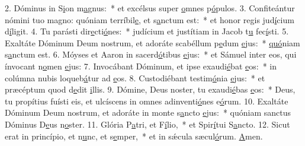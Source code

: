 2. Dóminus in S\uline{i}on m\uline{a}gnus:~* et excélsus super \uline{o}mnes p\uline{ó}pulos.
3. Confiteántur nómini tuo magno: quóniam terríbil\uline{e}, et s\uline{a}nctum est:~* et honor regis jud\uline{í}cium d\uline{í}ligit.
4. Tu parásti dir\uline{e}cti\uline{ó}nes:~* judícium et justítiam in Jacob t\uline{u} fec\uline{í}sti.
5. Exaltáte Dóminum Deum nostrum, et adoráte scabéllum p\uline{e}dum \uline{e}jus:~* \uline{quó}niam s\uline{a}nctum est.
6. Móyses et Aaron in sacerd\uline{ó}tibus \uline{e}jus:~* et Sámuel inter eos, qui ínvocant n\uline{o}men \uline{e}jus:
7. Invocábant Dóminum, et ipse exaudi\uline{é}bat \uline{e}os:~* in colúmna nubis loqueb\uline{á}tur ad \uline{e}os.
8. Custodiébant testim\uline{ó}nia \uline{e}jus:~* et præcéptum quod d\uline{e}dit \uline{i}llis.
9. Dómine, Deus noster, tu exaudi\uline{é}bas \uline{e}os:~* Deus, tu propítius fuísti eis, et ulcíscens in omnes adinventi\uline{ó}nes e\uline{ó}rum.
10. Exaltáte Dóminum Deum nostrum, et adoráte in monte s\uline{a}ncto \uline{e}jus:~* quóniam sanctus Dóminus D\uline{e}us n\uline{o}ster.
11. Glória P\uline{a}tri, et F\uline{í}lio,~* et Spir\uline{í}tui S\uline{a}ncto.
12. Sicut erat in princípio, et n\uline{u}nc, et s\uline{e}mper,~* et in sǽcula sæcul\uline{ó}rum. \uline{A}men.
